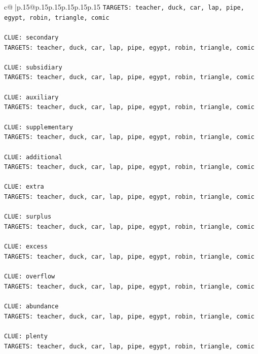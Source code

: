 \documentclass{article}
\begin{document}
{\begin{supertabular}{c@{$\;$}|p{.15\linewidth}@{}p{.15\linewidth}p{.15\linewidth}p{.15\linewidth}p{.15\linewidth}p{.15\linewidth}}
{{{\texttt{TARGETS: teacher, duck, car, lap, pipe, egypt, robin, triangle, comic} \\
\\ 
\texttt{CLUE: secondary} \\
\texttt{TARGETS: teacher, duck, car, lap, pipe, egypt, robin, triangle, comic} \\
\\ 
\texttt{CLUE: subsidiary} \\
\texttt{TARGETS: teacher, duck, car, lap, pipe, egypt, robin, triangle, comic} \\
\\ 
\texttt{CLUE: auxiliary} \\
\texttt{TARGETS: teacher, duck, car, lap, pipe, egypt, robin, triangle, comic} \\
\\ 
\texttt{CLUE: supplementary} \\
\texttt{TARGETS: teacher, duck, car, lap, pipe, egypt, robin, triangle, comic} \\
\\ 
\texttt{CLUE: additional} \\
\texttt{TARGETS: teacher, duck, car, lap, pipe, egypt, robin, triangle, comic} \\
\\ 
\texttt{CLUE: extra} \\
\texttt{TARGETS: teacher, duck, car, lap, pipe, egypt, robin, triangle, comic} \\
\\ 
\texttt{CLUE: surplus} \\
\texttt{TARGETS: teacher, duck, car, lap, pipe, egypt, robin, triangle, comic} \\
\\ 
\texttt{CLUE: excess} \\
\texttt{TARGETS: teacher, duck, car, lap, pipe, egypt, robin, triangle, comic} \\
\\ 
\texttt{CLUE: overflow} \\
\texttt{TARGETS: teacher, duck, car, lap, pipe, egypt, robin, triangle, comic} \\
\\ 
\texttt{CLUE: abundance} \\
\texttt{TARGETS: teacher, duck, car, lap, pipe, egypt, robin, triangle, comic} \\
\\ 
\texttt{CLUE: plenty} \\
\texttt{TARGETS: teacher, duck, car, lap, pipe, egypt, robin, triangle, comic} \\
}}}
\end{supertabular}}
\end{document}
